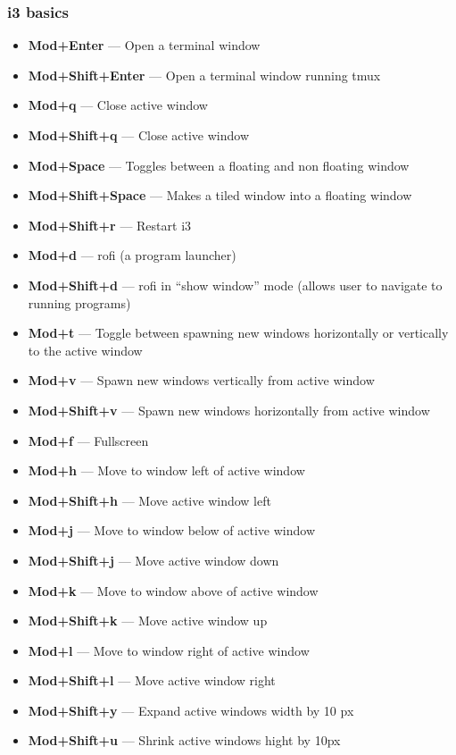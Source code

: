 \documentclass{article}
\begin{document}
\subsubsection{i3 basics}
\begin{itemize}
	\item \textbf{Mod+Enter} --- Open a terminal window
	\item \textbf{Mod+Shift+Enter} --- Open a terminal window running tmux
	\item \textbf{Mod+q} --- Close active window
	\item \textbf{Mod+Shift+q} --- Close active window
	\item \textbf{Mod+Space} --- Toggles between a floating and non floating window
	\item \textbf{Mod+Shift+Space} --- Makes a tiled window into a floating window
	\item \textbf{Mod+Shift+r} --- Restart i3
	\item \textbf{Mod+d} --- rofi (a program launcher)
	\item \textbf{Mod+Shift+d} --- rofi in ``show window'' mode (allows user to navigate to running programs)
	\item \textbf{Mod+t} --- Toggle between spawning new windows horizontally or vertically to the active window
	\item \textbf{Mod+v} --- Spawn new windows vertically from active window
	\item \textbf{Mod+Shift+v} --- Spawn new windows horizontally from active window
	\item \textbf{Mod+f} --- Fullscreen
	\item \textbf{Mod+h} --- Move to window left of active window
	\item \textbf{Mod+Shift+h} --- Move active window left
	\item \textbf{Mod+j} --- Move to window below of active window
	\item \textbf{Mod+Shift+j} --- Move active window down
	\item \textbf{Mod+k} --- Move to window above of active window
	\item \textbf{Mod+Shift+k} --- Move active window up
	\item \textbf{Mod+l} --- Move to window right of active window
	\item \textbf{Mod+Shift+l} --- Move active window right
	\item \textbf{Mod+Shift+y} --- Expand active windows width by 10 px
	\item \textbf{Mod+Shift+u} --- Shrink active windows hight by 10px

\end{itemize}
\end{document}
